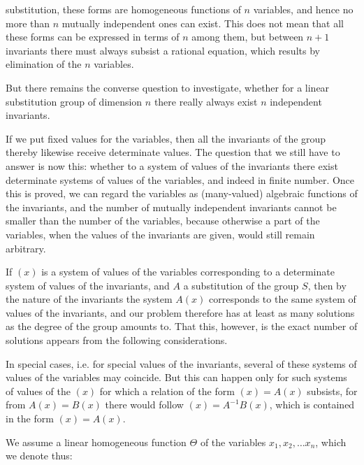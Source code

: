 substitution, these forms are homogeneous functions of
$n$ variables, and hence no more than $n$ mutually
independent ones can exist. This does not mean that all
these forms can be expressed  in terms of $n$ among them,
but between $n+1$ invariants there must always subsist a rational
equation, which results by elimination of the $n$ variables.

But there remains the converse question to investigate, whether
for a linear substitution group of dimension
$n$ there really always exist $n$ independent invariants.

If we put fixed values for the variables, then all the
invariants of the group thereby likewise receive
determinate values. The question that we still have to answer
is now this: whether to a system of values of the invariants
there exist determinate systems of values of the variables, and
indeed in finite number. Once this is proved, we can regard the
variables as (many-valued) algebraic functions of the invariants,
and the number of mutually independent
invariants cannot be smaller than the number
of the variables, because otherwise a part of the variables, when the
values of the invariants are given, would still remain
arbitrary.

If $(x)$ is a system of values of the variables corresponding
to a determinate system of values of the invariants, and $A$ a substitution
of the group $S$, then by the nature of the invariants
the system $A(x)$ corresponds to the same system of values of the invariants,
and our problem therefore has at least as many
solutions as the degree of the group amounts to. That this, however, is the
exact number of solutions appears from the following
considerations.

In special cases, i.e. for special values of the invariants,
several of these systems of values of the variables
may coincide. But this can happen only for such systems of values
of the $(x)$ for which a relation of the form
$(x) = A(x)$ subsists, for from $A(x) = B(x)$ there would follow $(x) = A^{-1}B(x)$,
which is contained in the form $(x) = A(x)$.

We assume a linear homogeneous function $\Theta$ of the variables
$x_1, x_2, \dots x_n$, which we denote thus:
